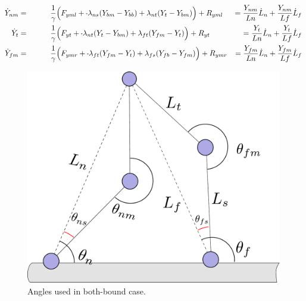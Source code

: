 \documentclass[11pt,twocolumn]{article}
\newcommand{\mn}{\scalebox{0.7}[1.0]{-}}
\begin{document}
\begin{align}
  \dot{Y}_{nm} &= \hspace{1cm} \frac{1}{\gamma} \Big(F_{yml} + \mn \lambda_{ns}(Y_{bm} - Y_{bb})
  + \lambda_{nt}(Y_{t } - Y_{bm}) \Big) + R_{yml}
  &= \frac{Y_{nm}}{Ln}\dot{L}_n + \frac{Y_{nm}}{Lf}\dot{L}_f\\
  \dot{Y}_{t}  &= \hspace{1cm} \frac{1}{\gamma} \Big(F_{yt } + \mn \lambda_{nt}(Y_{t } - Y_{bm})
  + \lambda_{ft}(Y_{fm} - Y_{t }) \Big) + R_{yt }
  &= \frac{Y_{t}}{Ln}\dot{L}_n + \frac{Y_{t}}{Lf}\dot{L}_f\\
  \dot{Y}_{fm} &= \hspace{1cm} \frac{1}{\gamma} \Big(F_{ymr} + \mn \lambda_{ft}(Y_{fm} - Y_{t })
  + \lambda_{fs}(Y_{fb} - Y_{fm}) \Big) + R_{ymr}
  &= \frac{Y_{fm}}{Ln}\dot{L}_n + \frac{Y_{fm}}{Lf}\dot{L}_f
\end{align}

\twocolumn

\begin{figure}
  \includegraphics[width=\columnwidth]{../figures/similar-bothbound}
  \caption{Angles used in both-bound case.}\label{fig:similar}
\end{figure}
\end{document}
